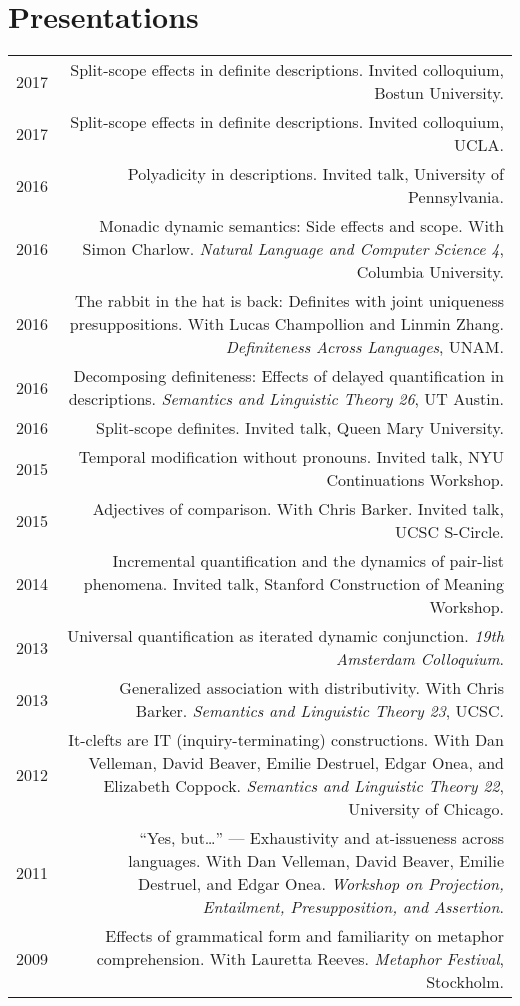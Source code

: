 \documentclass[12pt]{article}
\begin{document}
\medskip

\section*{Presentations}

\begin{longtable}{LR}
  2017 &  Split-scope effects in definite descriptions. Invited colloquium,
          Bostun University.\\
  2017 &  Split-scope effects in definite descriptions. Invited colloquium,
          UCLA.\\
  2016 &  Polyadicity in descriptions. Invited talk, University of
          Pennsylvania.\\
  2016 &  Monadic dynamic semantics: Side effects and scope. With Simon
          Charlow. \textit{Natural Language and Computer Science 4}, Columbia
          University.\\
  2016 &  The rabbit in the hat is back: Definites with joint uniqueness
          presuppositions. With Lucas Champollion and Linmin Zhang.
          \textit{Definiteness Across Languages}, UNAM.\\
  2016 &  Decomposing definiteness: Effects of delayed quantification in
          descriptions. \textit{Semantics and Linguistic Theory 26}, UT Austin.\\
  2016 &  Split-scope definites. Invited talk, Queen Mary University.\\
  2015 &  Temporal modification without pronouns. Invited talk, NYU
          Continuations Workshop.\\
  2015 &  Adjectives of comparison. With Chris Barker. Invited talk, UCSC
          S-Circle.\\
  2014 &  Incremental quantification and the dynamics of pair-list phenomena.
          Invited talk, Stanford Construction of Meaning Workshop.\\
  2013 &  Universal quantification as iterated dynamic conjunction. \textit{19th
          Amsterdam Colloquium}. \\
  2013 &  Generalized association with distributivity. With Chris Barker.
          \textit{Semantics and Linguistic Theory 23}, UCSC.\\
  2012 &  It-clefts are IT (inquiry-terminating) constructions. With Dan
          Velleman, David Beaver, Emilie Destruel, Edgar Onea, and Elizabeth
          Coppock. \textit{Semantics and Linguistic Theory 22}, University of
          Chicago.\\
  2011 &  ``Yes, but\dots'' --- Exhaustivity and at-issueness across languages.
           With Dan Velleman, David Beaver, Emilie Destruel, and Edgar Onea.
           \textit{Workshop on Projection, Entailment, Presupposition, and
           Assertion}.\\
  2009 &  Effects of grammatical form and familiarity on metaphor
          comprehension. With Lauretta Reeves. \textit{Metaphor Festival},
          Stockholm.
\end{longtable}
\end{document}
